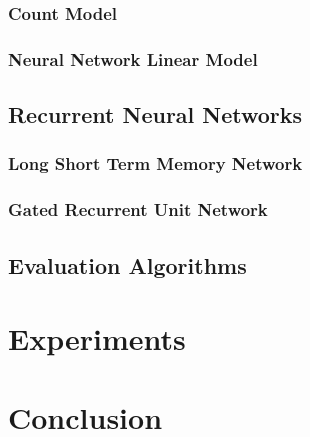 \documentclass[11pt]{article}
\begin{document}
\subsubsection{Count Model}

\subsubsection{Neural Network Linear Model}

\subsection{Recurrent Neural Networks}

\subsubsection{Long Short Term Memory Network}

\subsubsection{Gated Recurrent Unit Network}

\subsection{Evaluation Algorithms}


\section{Experiments}

\section{Conclusion}



\end{document}

